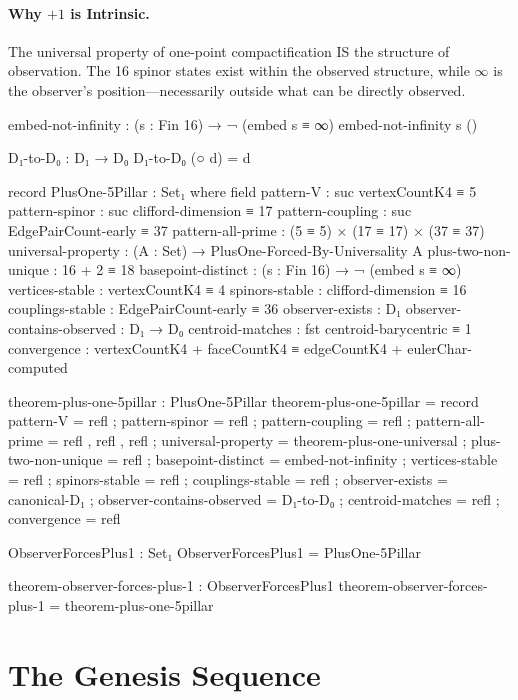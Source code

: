 \documentclass[11pt,a4paper]{book}
\begin{document}
\paragraph{Why $+1$ is Intrinsic.}
The universal property of one-point compactification IS the structure of observation. 
The 16 spinor states exist within the observed structure, while $\infty$ is the 
observer's position—necessarily outside what can be directly observed.

\begin{code}
embed-not-infinity : (s : Fin 16) → ¬ (embed s ≡ ∞)
embed-not-infinity s ()

D₁-to-D₀ : D₁ → D₀
D₁-to-D₀ (○ d) = d

record PlusOne-5Pillar : Set₁ where
  field
    pattern-V : suc vertexCountK4 ≡ 5
    pattern-spinor : suc clifford-dimension ≡ 17
    pattern-coupling : suc EdgePairCount-early ≡ 37
    pattern-all-prime : (5 ≡ 5) × (17 ≡ 17) × (37 ≡ 37)
    universal-property : (A : Set) → PlusOne-Forced-By-Universality A
    plus-two-non-unique : 16 + 2 ≡ 18
    basepoint-distinct : (s : Fin 16) → ¬ (embed s ≡ ∞)
    vertices-stable : vertexCountK4 ≡ 4
    spinors-stable : clifford-dimension ≡ 16
    couplings-stable : EdgePairCount-early ≡ 36
    observer-exists : D₁
    observer-contains-observed : D₁ → D₀
    centroid-matches : fst centroid-barycentric ≡ 1
    convergence : vertexCountK4 + faceCountK4 ≡ edgeCountK4 + eulerChar-computed

theorem-plus-one-5pillar : PlusOne-5Pillar
theorem-plus-one-5pillar = record
  { pattern-V = refl
  ; pattern-spinor = refl
  ; pattern-coupling = refl
  ; pattern-all-prime = refl , refl , refl
  ; universal-property = theorem-plus-one-universal
  ; plus-two-non-unique = refl
  ; basepoint-distinct = embed-not-infinity
  ; vertices-stable = refl
  ; spinors-stable = refl
  ; couplings-stable = refl
  ; observer-exists = canonical-D₁
  ; observer-contains-observed = D₁-to-D₀
  ; centroid-matches = refl
  ; convergence = refl
  }

ObserverForcesPlus1 : Set₁
ObserverForcesPlus1 = PlusOne-5Pillar

theorem-observer-forces-plus-1 : ObserverForcesPlus1
theorem-observer-forces-plus-1 = theorem-plus-one-5pillar
\end{code}

\section{The Genesis Sequence}
\end{document}
